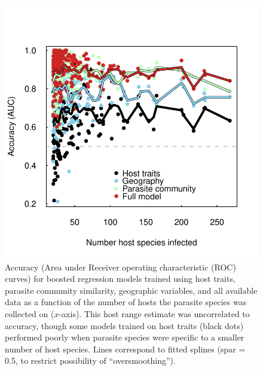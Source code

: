 \documentclass[12pt]{article}
\begin{document}
  \newpage
\begin{figure}[h]
  \includegraphics[width=\textwidth]{../Figures/hostNumAccuracy.pdf}
  \caption{Accuracy (Area under Receiver operating characteristic (ROC) curves) for boosted regression models trained using host traits, parasite community similarity, geographic variables, and all available data as a function of the number of hosts the parasite species was collected on ($x$-axis). This host range estimate was uncorrelated to accuracy, though some models trained on host traits (black dots) performed poorly when parasite species were specific to a smaller number of host species. Lines correspond to fitted splines (spar = 0.5, to restrict possibility of ``oversmoothing''). }
 \label{fig:HostNum}
 \end{figure}
\end{document}
